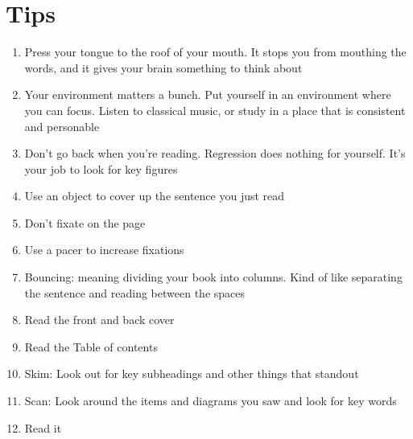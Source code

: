 \documentclass{article}
\begin{document}
\section*{Tips}
    \begin{enumerate}
    
        \item Press your tongue to the roof of your mouth. It stops you from mouthing the words, and it gives your brain something to think about

        \item Your environment matters a bunch. Put yourself in an environment where you can focus. Listen to classical music, or study in a place that is consistent and personable

        \item Don't go back when you're reading. Regression does nothing for yourself. It's your job to look for key figures

        \item Use an object to cover up the sentence you just read

        \item Don't fixate on the page

        \item Use a pacer to increase fixations

        \item Bouncing: meaning dividing your book into columns. Kind of like separating the sentence and reading between the spaces

        \item Read the front and back cover

        \item Read the Table of contents

        \item Skim: Look out for key subheadings and other things that standout

        \item Scan: Look around the items and diagrams you saw and look for key words

        \item Read it
    \end{enumerate}
    
\end{document}
